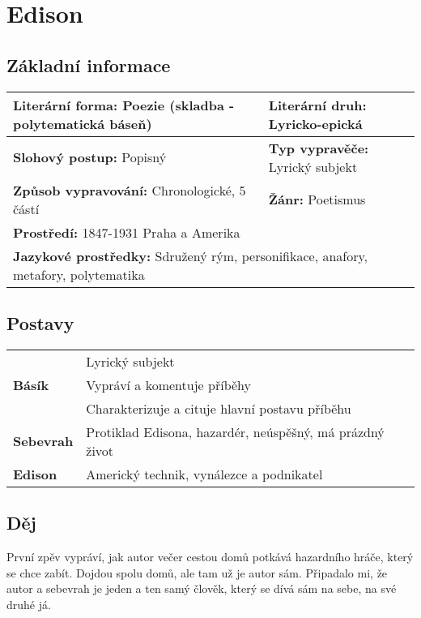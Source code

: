 \section{Edison}
\subsection*{Základní informace}
\begin{tabularx}{\linewidth}{l|l}
    \textbf{Literární forma:} Poezie (skladba - polytematická báseň)  & \textbf{Literární druh:} Lyricko-epická                  \\
    \hline
    \textbf{Slohový postup:} Popisný                    & \textbf{Typ vypravěče:} Lyrický subjekt                  \\
    \hline
    \textbf{Způsob vypravování:} Chronologické, 5 částí & \textbf{Žánr:} Poetismus                                 \\
    \hline
    \multicolumn{2}{l}{\textbf{Prostředí:} 1847-1931 Praha a Amerika}                                              \\
    \hline
    \multicolumn{2}{l}{\textbf{Jazykové prostředky:} Sdružený rým, personifikace, anafory, metafory, polytematika} \\
\end{tabularx}
\subsection*{Postavy}
\begin{tabularx}{\linewidth}{l|l}
    \multirow{3}{15em}{\textbf{Básík}} & Lyrický subjekt                                          \\
                                       & Vypráví a komentuje příběhy                              \\
                                       & Charakterizuje a cituje hlavní postavu příběhu           \\
    \hline
    \textbf{Sebevrah}                  & Protiklad Edisona, hazardér, neúspěšný, má prázdný život \\
    \hline
    \textbf{Edison}                    & Americký technik, vynálezce a podnikatel                 \\
\end{tabularx}
\subsection*{Děj}
První zpěv vypráví, jak autor večer cestou domů potkává hazardního hráče, který se chce zabít.
Dojdou spolu domů, ale tam už je autor sám.
Připadalo mi, že autor a sebevrah je jeden a ten samý člověk, který se dívá sám na sebe, na své druhé já.

